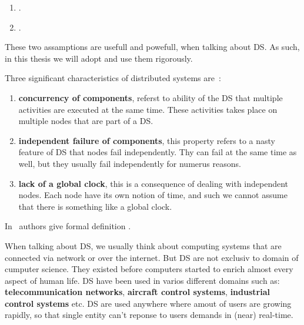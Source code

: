 \begin{enumerate}[start=1,label={(\bfseries \arabic*)}]
	\item  {}.
	\item {}.
\end{enumerate}

\noindent
These two assamptions are usefull and powefull, when talking about DS. As such, in this thesis we will adopt and use them rigorously.

Three significant characteristics of distributed systems are~\cite{0019513}: 

\begin{enumerate}[start=1,label={(\bfseries \arabic*)}]
	\item \textbf{concurrency of components}, referst to ability of the DS that multiple activities are executed at the same time. These activities takes place on multiple nodes that are part of a DS.
	\item \textbf{independent failure of components}, this property refers to a nasty feature of DS that nodes fail independently. Thy can fail at the same time as well, but they usually fail independently for numerus reasons.
	\item \textbf{lack of a global clock}, this is a consequence of dealing with independent nodes. Each node have its own notion of time, and such we cannot assume that there is something like a global clock.
\end{enumerate} 

In~\cite{SteenT16} authors give formal definition .

When talking about DS, we usually think about computing systems that are connected via network or over the internet. But DS are not exclusiv to domain of cumputer science. They existed before computers started to enrich almost every aspect of human life. DS have been used in varios different domains such as: \textbf{telecommunication networks}, \textbf{aircraft control systems}, \textbf{industrial control systems} etc. DS are used anywhere where amout of users are growing rapidly, so that single entity can't reponse to users demands in (near) real-time.

